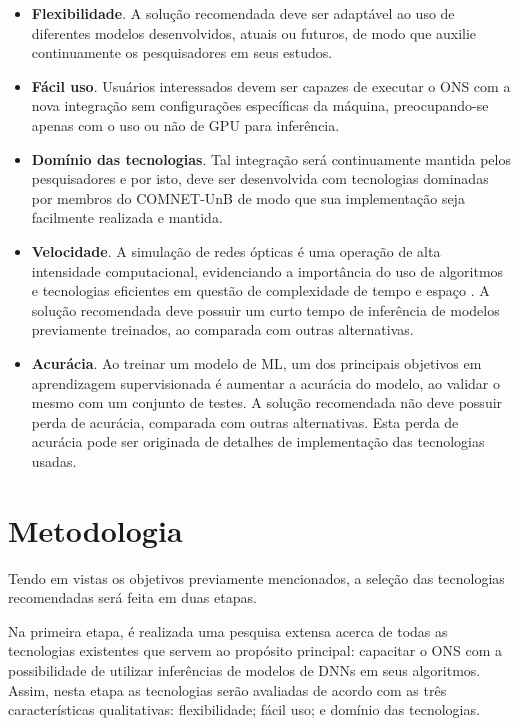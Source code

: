 \begin{itemize}
  \item \textbf{Flexibilidade}. A solução recomendada deve ser adaptável ao uso de diferentes modelos desenvolvidos, atuais ou futuros, de modo que auxilie continuamente os pesquisadores em seus estudos.
  \item \textbf{Fácil uso}. Usuários interessados devem ser capazes de executar o ONS com a nova integração sem configurações específicas da máquina, preocupando-se apenas com o uso ou não de GPU para inferência.
  \item \textbf{Domínio das tecnologias}. Tal integração será continuamente mantida pelos pesquisadores e por isto, deve ser desenvolvida com tecnologias dominadas por membros do COMNET-UnB de modo que sua implementação seja facilmente realizada e mantida.
  \item \textbf{Velocidade}. A simulação de redes ópticas é uma operação de alta intensidade computacional, evidenciando a importância do uso de algoritmos e tecnologias eficientes em questão de complexidade de tempo e espaço \cite{chehab_2019}. A solução recomendada deve possuir um curto tempo de inferência de modelos previamente treinados, ao comparada com outras alternativas.
  \item \textbf{Acurácia}. Ao treinar um modelo de ML, um dos principais objetivos em aprendizagem supervisionada é aumentar a acurácia do modelo, ao validar o mesmo com um conjunto de testes. A solução recomendada não deve possuir perda de acurácia, comparada com outras alternativas. Esta perda de acurácia pode ser originada de detalhes de implementação das tecnologias usadas.
\end{itemize}

\section{Metodologia}
\label{intro-methodology}

Tendo em vistas os objetivos previamente mencionados, a seleção das tecnologias recomendadas será feita em duas etapas.

Na primeira etapa, é realizada uma pesquisa extensa acerca de todas as tecnologias existentes que servem ao propósito principal: capacitar o ONS com a possibilidade de utilizar inferências de modelos de DNNs em seus algoritmos. Assim, nesta etapa as tecnologias serão avaliadas de acordo com as três características qualitativas: flexibilidade; fácil uso; e domínio das tecnologias.


